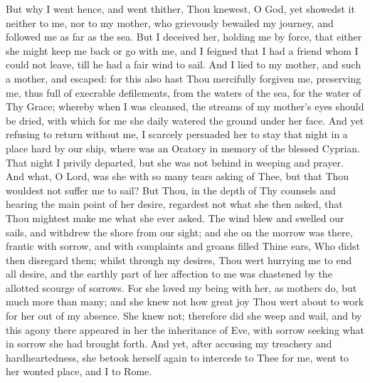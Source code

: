 \documentclass[b5paper,openright,12pt,twoside]{book}
\begin{document}
But why I went hence, and went thither, Thou knewest, O God, yet
showedst it neither to me, nor to my mother, who grievously bewailed my
journey, and followed me as far as the sea. But I deceived her, holding
me by force, that either she might keep me back or go with me, and I
feigned that I had a friend whom I could not leave, till he had a fair
wind to sail. And I lied to my mother, and such a mother, and escaped:
for this also hast Thou mercifully forgiven me, preserving me, thus full
of execrable defilements, from the waters of the sea, for the water of
Thy Grace; whereby when I was cleansed, the streams of my mother's eyes
should be dried, with which for me she daily watered the ground under
her face. And yet refusing to return without me, I scarcely persuaded
her to stay that night in a place hard by our ship, where was an Oratory
in memory of the blessed Cyprian. That night I privily departed, but she
was not behind in weeping and prayer. And what, O Lord, was she with so
many tears asking of Thee, but that Thou wouldest not suffer me to sail?
But Thou, in the depth of Thy counsels and hearing the main point of her
desire, regardest not what she then asked, that Thou mightest make me
what she ever asked. The wind blew and swelled our sails, and withdrew
the shore from our sight; and she on the morrow was there, frantic with
sorrow, and with complaints and groans filled Thine ears, Who didst then
disregard them; whilst through my desires, Thou wert hurrying me to end
all desire, and the earthly part of her affection to me was chastened
by the allotted scourge of sorrows. For she loved my being with her, as
mothers do, but much more than many; and she knew not how great joy Thou
wert about to work for her out of my absence. She knew not; therefore
did she weep and wail, and by this agony there appeared in her the
inheritance of Eve, with sorrow seeking what in sorrow she had brought
forth. And yet, after accusing my treachery and hardheartedness, she
betook herself again to intercede to Thee for me, went to her wonted
place, and I to Rome.
\end{document}
